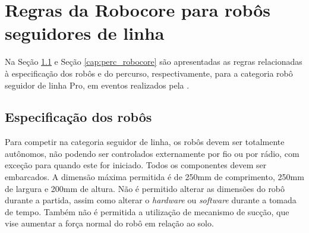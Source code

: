 \vspace{1cm}
\section{Regras da Robocore para robôs seguidores de linha} \label{cap:regras_comp}

Na Seção \ref{cap:espc_robocore} e Seção \ref{cap:perc_robocore} são apresentadas as regras relacionadas à 
especificação dos robôs e do percurso, respectivamente, 
para a categoria robô seguidor de linha Pro, em eventos realizados pela .

\vspace{1cm}
\subsection{Especificação dos robôs} \label{cap:espc_robocore}

Para competir na categoria seguidor de linha, os robôs devem ser totalmente autônomos, não podendo ser controlados 
externamente por fio ou por rádio, com exceção para quando este for iniciado. Todos os componentes devem ser embarcados. A 
dimensão máxima permitida é de 250mm   de   comprimento,   250mm   de   largura   e   200mm   de   altura. Não é 
permitido alterar as dimensões do robô durante a partida, assim como alterar o \textit{hardware} ou \textit{software} 
durante a tomada de tempo. Também não é permitida a utilização de mecanismo de sucção, 
que vise aumentar a força normal do robô em relação ao solo.

